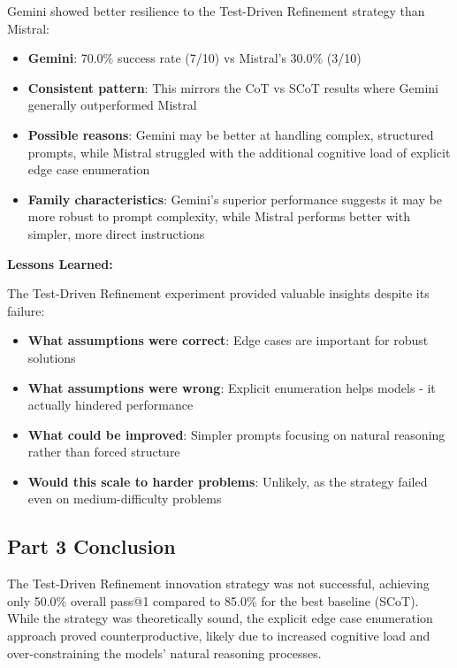 \documentclass[11pt]{article}
\begin{document}
Gemini showed better resilience to the Test-Driven Refinement strategy than Mistral:

\begin{itemize}
    \item \textbf{Gemini}: 70.0\% success rate (7/10) vs Mistral's 30.0\% (3/10)
    \item \textbf{Consistent pattern}: This mirrors the CoT vs SCoT results where Gemini generally outperformed Mistral
    \item \textbf{Possible reasons}: Gemini may be better at handling complex, structured prompts, while Mistral struggled with the additional cognitive load of explicit edge case enumeration
    \item \textbf{Family characteristics}: Gemini's superior performance suggests it may be more robust to prompt complexity, while Mistral performs better with simpler, more direct instructions
\end{itemize}

\textbf{Lessons Learned:}

The Test-Driven Refinement experiment provided valuable insights despite its failure:

\begin{itemize}
    \item \textbf{What assumptions were correct}: Edge cases are important for robust solutions
    \item \textbf{What assumptions were wrong}: Explicit enumeration helps models - it actually hindered performance
    \item \textbf{What could be improved}: Simpler prompts focusing on natural reasoning rather than forced structure
    \item \textbf{Would this scale to harder problems}: Unlikely, as the strategy failed even on medium-difficulty problems
\end{itemize}

\subsection{Part 3 Conclusion}

The Test-Driven Refinement innovation strategy was not successful, achieving only 50.0\% overall pass@1 compared to 85.0\% for the best baseline (SCoT). While the strategy was theoretically sound, the explicit edge case enumeration approach proved counterproductive, likely due to increased cognitive load and over-constraining the models' natural reasoning processes.
\end{document}
